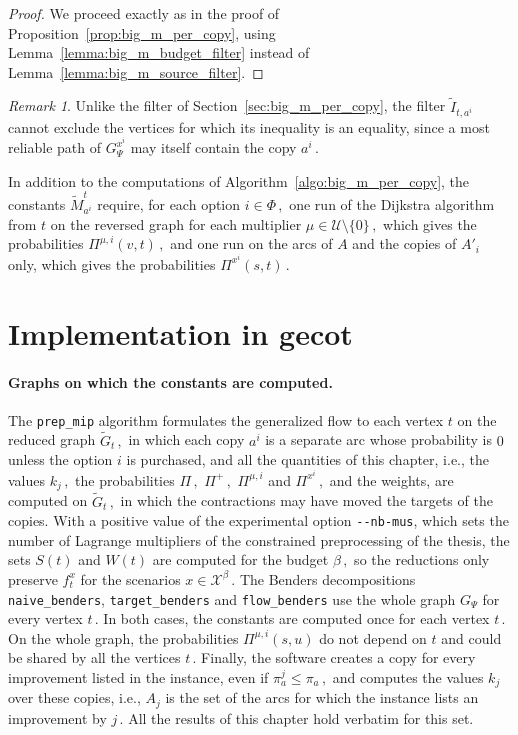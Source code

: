 \documentclass[11pt,a4paper]{report}
\theoremstyle{definition}
\theoremstyle{remark}
\newtheorem*{remark}{Remark}
\begin{document}
\begin{proof}
  We proceed exactly as in the proof of Proposition~\ref{prop:big_m_per_copy}, using Lemma~\ref{lemma:big_m_budget_filter} instead of Lemma~\ref{lemma:big_m_source_filter}.
\end{proof}

\begin{remark}
  Unlike the filter of Section~\ref{sec:big_m_per_copy}, the filter $\tilde{I}_{t,a^i}$ cannot exclude the vertices for which its inequality is an equality, since a most reliable path of $G^{x^i}_\Psi$ may itself contain the copy $a^i\,.$
\end{remark}

In addition to the computations of Algorithm~\ref{algo:big_m_per_copy}, the constants $\tilde{M}^t_{a^i}$ require, for each option $i \in \Phi\,,$ one run of the Dijkstra algorithm from $t$ on the reversed graph for each multiplier $\mu \in \mathcal{U} \setminus \{0\}\,,$ which gives the probabilities $\Pi^{\mu,i}(v,t)\,,$ and one run on the arcs of $A$ and the copies of $A'_i$ only, which gives the probabilities $\Pi^{x^i}(s,t)\,.$


\section{Implementation in gecot}\label{sec:big_m_implementation}

\noindent
\paragraph{Graphs on which the constants are computed.}
The \texttt{prep\_mip} algorithm formulates the generalized flow to each vertex $t$ on the reduced graph $\widetilde{G}_t\,,$ in which each copy $a^i$ is a separate arc whose probability is $0$ unless the option $i$ is purchased, and all the quantities of this chapter, i.e., the values $k_j\,,$ the probabilities $\Pi\,,$ $\Pi^+\,,$ $\Pi^{\mu,i}$ and $\Pi^{x^i}\,,$ and the weights, are computed on $\widetilde{G}_t\,,$ in which the contractions may have moved the targets of the copies. With a positive value of the experimental option \texttt{-{}-nb-mus}, which sets the number of Lagrange multipliers of the constrained preprocessing of the thesis, the sets $S(t)$ and $W(t)$ are computed for the budget $\beta\,,$ so the reductions only preserve $f^x_t$ for the scenarios $x \in \mathcal{X}^\beta\,.$ The Benders decompositions \texttt{naive\_benders}, \texttt{target\_benders} and \texttt{flow\_benders} use the whole graph $G_\Psi$ for every vertex $t\,.$ In both cases, the constants are computed once for each vertex $t\,.$ On the whole graph, the probabilities $\Pi^{\mu,i}(s,u)$ do not depend on $t$ and could be shared by all the vertices $t\,.$ Finally, the software creates a copy for every improvement listed in the instance, even if $\pi^j_a \leq \pi_a\,,$ and computes the values $k_j$ over these copies, i.e., $A_j$ is the set of the arcs for which the instance lists an improvement by $j\,.$ All the results of this chapter hold verbatim for this set.
\end{document}

